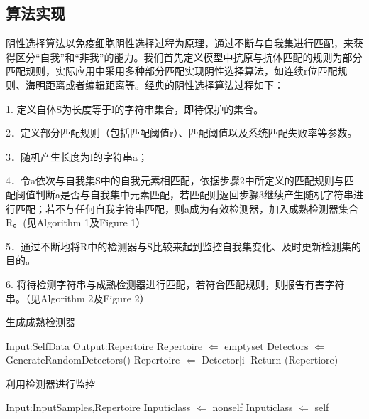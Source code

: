 \documentclass[preprint,12pt,3p]{elsarticle}
\begin{document}
\subsection{算法实现}
\label{subsec1}
阴性选择算法以免疫细胞阴性选择过程为原理，通过不断与自我集进行匹配，来获得区分“自我”和“非我”的能力。我们首先定义模型中抗原与抗体匹配的规则为部分匹配规则，实际应用中采用多种部分匹配实现阴性选择算法，如连续r位匹配规则、海明距离或者编辑距离等。经典的阴性选择算法过程如下：
\par
1. 定义自体S为长度等于l的字符串集合，即待保护的集合。
\par
2．定义部分匹配规则（包括匹配阈值r）、匹配阈值以及系统匹配失败率等参数。
\par
3．随机产生长度为l的字符串a；
\par
4．令a依次与自我集S中的自我元素相匹配，依据步骤2中所定义的匹配规则与匹配阈值判断a是否与自我集中元素匹配，若匹配则返回步骤3继续产生随机字符串进行匹配；若不与任何自我字符串匹配，则a成为有效检测器，加入成熟检测器集合R。(见Algorithm 1及Figure 1）
\par
5．通过不断地将R中的检测器与S比较来起到监控自我集变化、及时更新检测集的目的。
\par
6. 将待检测字符串与成熟检测器进行匹配，若符合匹配规则，则报告有害字符串。（见Algorithm 2及Figure 2）

\begin{algorithm}[H]
  \caption{生成成熟检测器}          
  \label{alg1}  
    \begin{algorithmic}  
       \STATE Input:SelfData
       \STATE Output:Repertoire
       \STATE Repertoire $\Leftarrow$ emptyset
       \STATE Detectors $\Leftarrow$ GenerateRandomDetectors()
       \STATE Repertoire $\Leftarrow$ Detector[i]
       \ENDIF
       \ENDFOR
       \ENDWHILE
       \STATE Return (Repertiore)
   \end{algorithmic}
\end{algorithm} 

\begin{algorithm}[H]
 \caption{利用检测器进行监控}          
 \label{alg2}      
   \begin{algorithmic}  
      \STATE Input:InputSamples,Repertoire
      \STATE Inputiclass $\Leftarrow$ nonself  
      \STATE Inputiclass $\Leftarrow$ self
      \ENDIF
      \ENDFOR
      \ENDFOR            
   \end{algorithmic}
\end{algorithm} 
\end{document}
